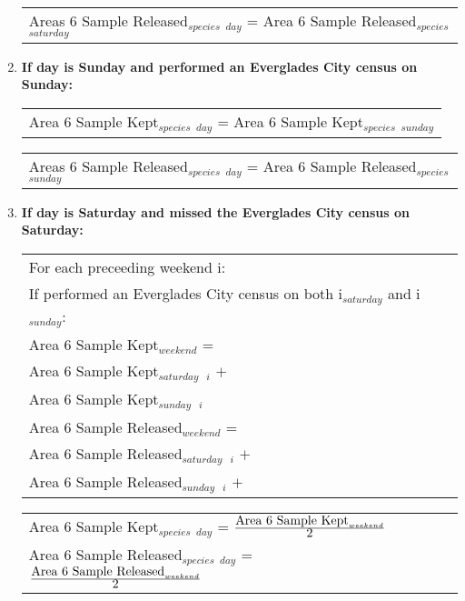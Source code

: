 \documentclass[letterpaper,12pt]{article}
\newcommand{\hspacer}{\hspace*{1cm}}
\newcommand{\fraction}[1]{\textrm{\normalsize{#1}}}
\begin{document}
\begin{enumerate}
\begin{tabular}{l@{ }}
	Areas 6 Sample Released$_{species}$ $_{day}$ =
		Area 6 Sample Released$_{species}$ $_{saturday}$
\end{tabular}

\item
\textbf{If day is Sunday and performed an Everglades City census on Sunday:} \\
\begin{tabular}{l@{ }}
	Area 6 Sample Kept$_{species}$ $_{day}$ =
		Area 6 Sample Kept$_{species}$ $_{sunday}$
\end{tabular}

\begin{tabular}{l@{ }}
	Areas 6 Sample Released$_{species}$ $_{day}$ =
		Area 6 Sample Released$_{species}$ $_{sunday}$
\end{tabular}

\item
\textbf{If day is Saturday and missed the Everglades City census on Saturday:} \\
\begin{tabular}{l@{ }l@{ }l}
	For each preceeding weekend i: \\
\hspacer If performed an Everglades City census on both i$_{saturday}$ and i$_{sunday}$: \\
\hspacer \hspacer	Area 6 Sample Kept$_{weekend}$ = \\
\hspacer \hspacer \hspacer Area 6 Sample Kept$_{saturday}$\ $_{i}$ $+$ \\
\hspacer \hspacer \hspacer Area 6 Sample Kept$_{sunday}$\ $_{i}$ \\

\hspacer \hspacer	Area 6 Sample Released$_{weekend}$ = \\
\hspacer \hspacer \hspacer Area 6 Sample Released$_{saturday}$\ $_{i}$ $+$ \\
\hspacer \hspacer \hspacer Area 6 Sample Released$_{sunday}$\ $_{i}$ $+$
\end{tabular}

\begin{tabular}{l@{ }l@{ }l}
	Area 6 Sample Kept$_{species}$ $_{day}$ =
		$
\frac
	{\fraction{Area 6 Sample Kept}_{weekend}}
      	{\fraction{2}}
		$ \\

	Area 6 Sample Released$_{species}$ $_{day}$ =
		$
\frac
	{\fraction{Area 6 Sample Released}_{weekend}}
      	{\fraction{2}}
		$
\end{tabular}


\end{enumerate}
\end{document}
